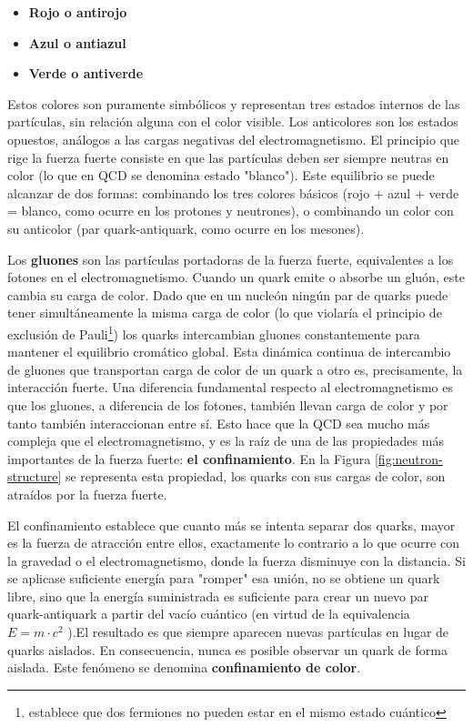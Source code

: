 \begin{itemize}
	\item \textbf{Rojo o antirojo}
	\item \textbf{Azul o antiazul}
	\item \textbf{Verde o antiverde}
\end{itemize}

Estos colores son puramente simbólicos y representan tres estados internos de las partículas, sin relación alguna con el color visible. Los anticolores son los estados opuestos, análogos a las cargas negativas del electromagnetismo. El principio que rige la fuerza fuerte consiste en que las partículas deben ser siempre neutras en color (lo que en QCD se denomina estado "blanco"). Este equilibrio se puede alcanzar de dos formas: combinando los tres colores básicos (rojo + azul + verde = blanco, como ocurre en los protones y neutrones), o combinando un color con su anticolor (par quark-antiquark, como ocurre en los mesones).

Los \textbf{gluones} son las partículas portadoras de la fuerza fuerte, equivalentes a los fotones en el electromagnetismo. Cuando un quark emite o absorbe un gluón, este cambia su carga de color. Dado que en un nucleón ningún par de quarks puede tener simultáneamente la misma carga de color (lo que violaría el principio de exclusión de Pauli\footnote{establece que dos fermiones no pueden estar en el mismo estado cuántico}) los quarks intercambian gluones constantemente para mantener el equilibrio cromático global. Esta dinámica continua de intercambio de gluones que transportan carga de color de un quark a otro es, precisamente, la interacción fuerte.
Una diferencia fundamental respecto al electromagnetismo es que los gluones, a diferencia de los fotones, también llevan carga de color y por tanto también interaccionan entre sí. Esto hace que la QCD sea mucho más compleja que el electromagnetismo, y es la raíz de una de las propiedades más importantes de la fuerza fuerte: \textbf{el confinamiento}.
En la Figura \ref{fig:neutron-structure} se representa esta propiedad, los quarks con sus cargas de color, son atraídos por la fuerza fuerte.

El confinamiento establece que cuanto más se intenta separar dos quarks, mayor es la fuerza de atracción entre ellos, exactamente lo contrario a lo que ocurre con la gravedad o el electromagnetismo, donde la fuerza disminuye con la distancia. Si se aplicase suficiente energía para "romper" esa unión, no se obtiene un quark libre, sino que la energía suministrada es suficiente para crear un nuevo par quark-antiquark a partir del vacío cuántico (en virtud de la equivalencia $E = m \cdot c^2$ ).El resultado es que siempre aparecen nuevas partículas en lugar de quarks aislados. En consecuencia, nunca es posible observar un quark de forma aislada. Este fenómeno se denomina \textbf{confinamiento de color}.



